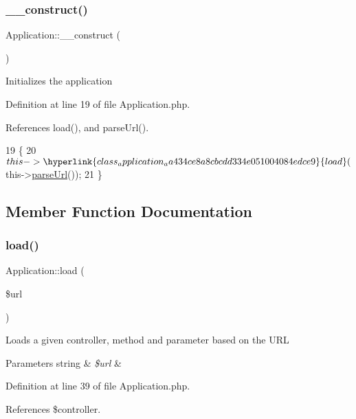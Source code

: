 \subsubsection{\texorpdfstring{\+\_\+\+\_\+construct()}{\_\_construct()}}
{\footnotesize\ttfamily Application\+::\+\_\+\+\_\+construct (\begin{DoxyParamCaption}{ }\end{DoxyParamCaption})}

Initializes the application 

Definition at line 19 of file Application.\+php.



References load(), and parse\+Url().


\begin{DoxyCode}
19                                   \{
20         $this->\hyperlink{class_application_aa434ce8a8cbcdd334e051004084edce9}{load}($this->\hyperlink{class_application_ac3007e038071f04135b5fcfcfdf9318c}{parseUrl}());
21     \}
\end{DoxyCode}


\subsection{Member Function Documentation}
\hypertarget{class_application_aa434ce8a8cbcdd334e051004084edce9}{}\label{class_application_aa434ce8a8cbcdd334e051004084edce9} 
\subsubsection{\texorpdfstring{load()}{load()}}
{\footnotesize\ttfamily Application\+::load (\begin{DoxyParamCaption}\item[{}]{\$url }\end{DoxyParamCaption})\hspace{0.3cm}{\ttfamily [protected]}}

Loads a given controller, method and parameter based on the U\+RL


\begin{DoxyParams}[1]{Parameters}
string & {\em \$url} & \\
\hline
\end{DoxyParams}


Definition at line 39 of file Application.\+php.



References \$controller.



